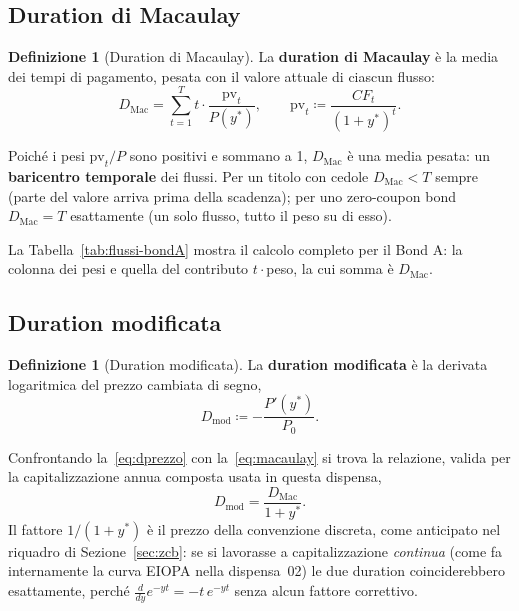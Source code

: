 \documentclass[11pt,a4paper]{article}
\theoremstyle{plain}
\theoremstyle{definition}
\newtheorem{definizione}[teorema]{Definizione}
\theoremstyle{remark}
\newcommand{\defeq}{\coloneqq}
\begin{document}
\subsection{Duration di Macaulay}

\begin{definizione}[Duration di Macaulay]
\label{def:macaulay}
La \textbf{duration di Macaulay} è la media dei tempi di pagamento, pesata con il valore
attuale di ciascun flusso:
\begin{equation}
  D_{\mathrm{Mac}} = \sum_{t=1}^{T} t \cdot \frac{\mathrm{pv}_t}{P(y^\ast)},
  \qquad \mathrm{pv}_t \defeq \frac{CF_t}{(1+y^\ast)^t}.
  \label{eq:macaulay}
\end{equation}
\end{definizione}
Poiché i pesi $\mathrm{pv}_t/P$ sono positivi e sommano a 1, $D_{\mathrm{Mac}}$ è una media
pesata: un \textbf{baricentro temporale} dei flussi. Per un titolo con cedole $D_{\mathrm{Mac}}
< T$ sempre (parte del valore arriva prima della scadenza); per uno zero-coupon bond
$D_{\mathrm{Mac}}=T$ esattamente (un solo flusso, tutto il peso su di esso).

La Tabella~\ref{tab:flussi-bondA} mostra il calcolo completo per il Bond A: la colonna dei pesi
e quella del contributo $t\cdot$peso, la cui somma è $D_{\mathrm{Mac}}$.



\subsection{Duration modificata}
\label{sec:duration-modificata}

\begin{definizione}[Duration modificata]
\label{def:modified}
La \textbf{duration modificata} è la derivata logaritmica del prezzo cambiata di segno,
\begin{equation}
  D_{\mathrm{mod}} \defeq -\frac{P'(y^\ast)}{P_0}.
  \label{eq:modified-def}
\end{equation}
\end{definizione}
Confrontando la~\eqref{eq:dprezzo} con la~\eqref{eq:macaulay} si trova la relazione, valida per
la capitalizzazione annua composta usata in questa dispensa,
\begin{equation}
  D_{\mathrm{mod}} = \frac{D_{\mathrm{Mac}}}{1+y^\ast}.
  \label{eq:mod-da-mac}
\end{equation}
Il fattore $1/(1+y^\ast)$ è il prezzo della convenzione discreta, come anticipato nel riquadro
di Sezione~\ref{sec:zcb}: se si lavorasse a capitalizzazione \emph{continua} (come fa
internamente la curva EIOPA nella dispensa~02) le due duration coinciderebbero esattamente,
perché $\frac{d}{dy}e^{-yt} = -t\,e^{-yt}$ senza alcun fattore correttivo.
\end{document}
